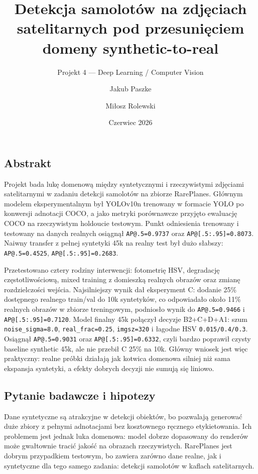 \documentclass[
  11pt,
]{article}
\title{Detekcja samolotów na zdjęciach satelitarnych pod przesunięciem
domeny synthetic-to-real}
\subtitle{Projekt 4 --- Deep Learning / Computer Vision}
\author{Jakub Paszke \and Miłosz Rolewski}
\date{Czerwiec 2026}
\begin{document}
\maketitle

{
\hypersetup{linkcolor=}
\setcounter{tocdepth}{2}
\tableofcontents
}
\hypertarget{abstrakt}{%
\subsection{Abstrakt}\label{abstrakt}}

Projekt bada lukę domenową między syntetycznymi i rzeczywistymi
zdjęciami satelitarnymi w zadaniu detekcji samolotów na zbiorze
RarePlanes. Głównym modelem eksperymentalnym był YOLOv10n trenowany w
formacie YOLO po konwersji adnotacji COCO, a jako metryki porównawcze
przyjęto ewaluację COCO na rzeczywistym holdoucie testowym. Punkt
odniesienia trenowany i testowany na danych realnych osiągnął
\texttt{AP@.5=0.9737} oraz \texttt{AP@{[}.5:.95{]}=0.8073}. Naiwny
transfer z pełnej syntetyki 45k na realny test był dużo słabszy:
\texttt{AP@.5=0.4525}, \texttt{AP@{[}.5:.95{]}=0.2683}.

Przetestowano cztery rodziny interwencji: fotometrię HSV, degradację
częstotliwościową, mixed training z domieszką realnych obrazów oraz
zmianę rozdzielczości wejścia. Najsilniejszy wynik dał eksperyment C:
dodanie 25\% dostępnego realnego train/val do 10k syntetyków, co
odpowiadało około 11\% realnych obrazów w zbiorze treningowym, podniosło
wynik do \texttt{AP@.5=0.9466} i \texttt{AP@{[}.5:.95{]}=0.7120}. Model
finalny 45k połączył decyzje B2+C+D+A1: szum \texttt{noise\_sigma=8.0},
\texttt{real\_frac=0.25}, \texttt{imgsz=320} i łagodne HSV
\texttt{0.015/0.4/0.3}. Osiągnął \texttt{AP@.5=0.9031} oraz
\texttt{AP@{[}.5:.95{]}=0.6332}, czyli bardzo poprawił czysty baseline
synthetic 45k, ale nie przebił C 25\% na 10k. Główny wniosek jest więc
praktyczny: realne próbki działają jak kotwica domenowa silniej niż sama
ekspansja syntetyki, a efekty dobrych decyzji nie sumują się liniowo.

\hypertarget{pytanie-badawcze-i-hipotezy}{%
\subsection{Pytanie badawcze i
hipotezy}\label{pytanie-badawcze-i-hipotezy}}

Dane syntetyczne są atrakcyjne w detekcji obiektów, bo pozwalają
generować duże zbiory z pełnymi adnotacjami bez kosztownego ręcznego
etykietowania. Ich problemem jest jednak luka domenowa: model dobrze
dopasowany do renderów może gwałtownie tracić jakość na obrazach
rzeczywistych. RarePlanes jest dobrym przypadkiem testowym, bo zawiera
zarówno dane realne, jak i syntetyczne dla tego samego zadania: detekcji
samolotów w kaflach satelitarnych.
\end{document}
